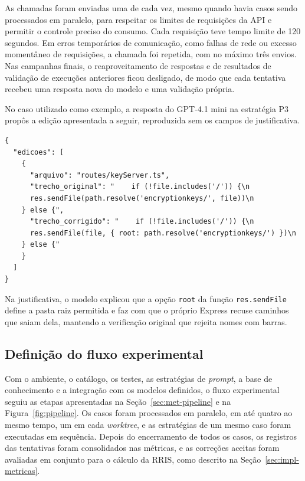 As chamadas foram enviadas uma de cada vez, mesmo quando havia casos sendo processados em paralelo, para respeitar os limites de requisições da API e permitir o controle preciso do consumo. Cada requisição teve tempo limite de 120 segundos. Em erros temporários de comunicação, como falhas de rede ou excesso momentâneo de requisições, a chamada foi repetida, com no máximo três envios. Nas campanhas finais, o reaproveitamento de respostas e de resultados de validação de execuções anteriores ficou desligado, de modo que cada tentativa recebeu uma resposta nova do modelo e uma validação própria.

No caso utilizado como exemplo, a resposta do GPT-4.1 mini na estratégia P3 propôs a edição apresentada a seguir, reproduzida sem os campos de justificativa.

{\footnotesize
\begin{verbatim}
{
  "edicoes": [
    {
      "arquivo": "routes/keyServer.ts",
      "trecho_original": "    if (!file.includes('/')) {\n
      res.sendFile(path.resolve('encryptionkeys/', file))\n
    } else {",
      "trecho_corrigido": "    if (!file.includes('/')) {\n
      res.sendFile(file, { root: path.resolve('encryptionkeys/') })\n
    } else {"
    }
  ]
}
\end{verbatim}
}

Na justificativa, o modelo explicou que a opção \texttt{root} da função \texttt{res.sendFile} define a pasta raiz permitida e faz com que o próprio Express recuse caminhos que saiam dela, mantendo a verificação original que rejeita nomes com barras.

\subsection{Definição do fluxo experimental}
\label{sec:impl-fluxo-experimental}

Com o ambiente, o catálogo, os testes, as estratégias de \textit{prompt}, a base de conhecimento e a integração com os modelos definidos, o fluxo experimental seguiu as etapas apresentadas na Seção~\ref{sec:met-pipeline} e na Figura~\ref{fig:pipeline}. Os casos foram processados em paralelo, em até quatro ao mesmo tempo, um em cada \textit{worktree}, e as estratégias de um mesmo caso foram executadas em sequência. Depois do encerramento de todos os casos, os registros das tentativas foram consolidados nas métricas, e as correções aceitas foram avaliadas em conjunto para o cálculo da RRIS, como descrito na Seção~\ref{sec:impl-metricas}.

